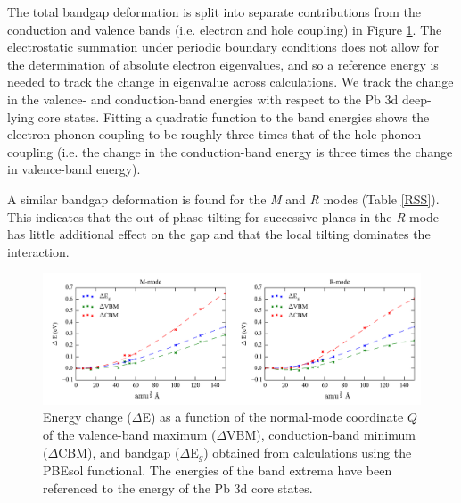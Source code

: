 The total bandgap deformation is split into separate contributions from the conduction and valence bands (i.e. electron and hole coupling) in Figure \ref{ch5figs1}.
The electrostatic summation under periodic boundary conditions 
does not allow for the determination of absolute electron eigenvalues, and so a reference energy is needed to track the change in eigenvalue across calculations.  
We track the change in the valence- 
and conduction-band energies with respect to the Pb 3d deep-lying core states.
Fitting a quadratic function to the band energies shows the electron-phonon coupling 
to be roughly three times that of the hole-phonon coupling (i.e. the change in the conduction-band energy is three times the change in valence-band energy). %

A similar bandgap deformation is found for the \textit{M} and \textit{R} modes (Table \ref{RSS}). This indicates that the out-of-phase tilting for successive planes in the \textit{R} mode has little additional effect on the gap and that the local tilting dominates the interaction.

\begin{figure}[h]
\includegraphics[width=\textwidth]{figures/ch5/fig_s3.png}
\caption[Bandgap deformation potential]{\label{ch5figs1}
Energy change ($\Delta$E) as a function of the normal-mode coordinate $Q$ of the valence-band maximum ($\Delta$VBM), conduction-band minimum ($\Delta$CBM), and bandgap ($\Delta$E$_g$) obtained from calculations using the PBEsol functional.
The energies of the band extrema have been referenced to the energy of the Pb 3d core states.
}
\end{figure}


